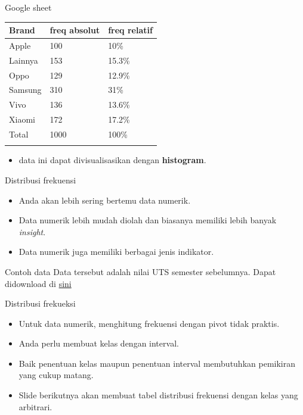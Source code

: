 \documentclass[
  ignorenonframetext,
]{beamer}
\providecommand{\tightlist}{%
  \setlength{\itemsep}{0pt}\setlength{\parskip}{0pt}}\usepackage{longtable,booktabs,array}
\begin{document}
\begin{frame}{Google sheet}
\label{google-sheet-1}
\begin{longtable}[]{@{}lll@{}}
\toprule\noalign{}
Brand & freq absolut & freq relatif \\
\midrule\noalign{}
\endhead
Apple & 100 & 10\% \\
Lainnya & 153 & 15.3\% \\
Oppo & 129 & 12.9\% \\
Samsung & 310 & 31\% \\
Vivo & 136 & 13.6\% \\
Xiaomi & 172 & 17.2\% \\
Total & 1000 & 100\% \\
\bottomrule\noalign{}
\end{longtable}

\begin{itemize}
\tightlist
\item
  data ini dapat divisualisasikan dengan \textbf{histogram}.
\end{itemize}
\end{frame}

\begin{frame}{Distribusi frekuensi}
\label{distribusi-frekuensi-1}
\begin{itemize}
\item
  Anda akan lebih sering bertemu data numerik.
\item
  Data numerik lebih mudah diolah dan biasanya memiliki lebih banyak
  \emph{insight}.
\item
  Data numerik juga memiliki berbagai jenis indikator.
\end{itemize}
\end{frame}

\begin{frame}{Contoh data}
\label{contoh-data}
Data tersebut adalah nilai UTS semester sebelumnya. Dapat didownload di
\href{https://docs.google.com/spreadsheets/d/e/2PACX-1vSdLsm-5nIFgcspOncjaLwwKX1vmGbTOvhkYVOFWdHS3h15EWmHcXDSm562eyR4MiftmPJiPom7X2RM/pubhtml}{sini}
\end{frame}

\begin{frame}{Distribusi frekueksi}
\label{distribusi-frekueksi}
\begin{itemize}
\item
  Untuk data numerik, menghitung frekuensi dengan pivot tidak praktis.
\item
  Anda perlu membuat kelas dengan interval.
\item
  Baik penentuan kelas maupun penentuan interval membutuhkan pemikiran
  yang cukup matang.
\item
  Slide berikutnya akan membuat tabel distribusi frekuensi dengan kelas
  yang arbitrari.
\end{itemize}
\end{frame}
\end{document}
